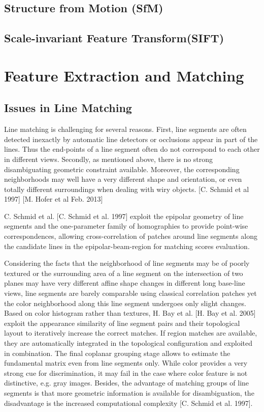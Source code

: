 \subsection{Structure from Motion (SfM)}


\subsection{Scale-invariant Feature Transform(SIFT)}


\section{Feature Extraction and Matching}


\subsection{Issues in Line Matching}

Line matching is challenging for several reasons. First, line segments are often detected inexactly by automatic line detectors or occlusions appear in part of the lines. Thus the end-points of a line segment often do not correspond to each other in different views. Secondly, as mentioned above, there is no strong disambiguating geometric constraint available. Moreover, the corresponding neighborhoods may well have a very different shape and orientation, or even totally different surroundings when dealing with wiry objects. [C. Schmid et al 1997] [M. Hofer et al Feb. 2013]

C. Schmid et al. [C. Schmid et al. 1997] exploit the epipolar geometry of line segments and the one-parameter family of homographies to provide point-wise correspondences, allowing cross-correlation of patches around line segments along the candidate lines in the epipolar-beam-region for matching scores evaluation.

Considering the facts that the neighborhood of line segments may be of poorly textured or the surrounding area of a line segment on the intersection of two planes may have very different affine shape changes in different long base-line views, line segments are barely comparable using classical correlation patches yet the color neighborhood along this line segment undergoes only slight changes. Based on color histogram rather than textures, H. Bay et al. [H. Bay et al. 2005] exploit the appearance similarity of line segment pairs and their topological layout to iteratively increase the correct matches. If region matches are available, they are automatically integrated in the topological configuration and exploited in combination. The final coplanar grouping stage allows to estimate the fundamental matrix even from line segments only. While color provides a very strong cue for discrimination, it may fail in the case where color feature is not distinctive, e.g. gray images. Besides, the advantage of matching groups of line segments is that more geometric information is available for disambiguation, the disadvantage is the increased computational complexity [C. Schmid et al. 1997].


